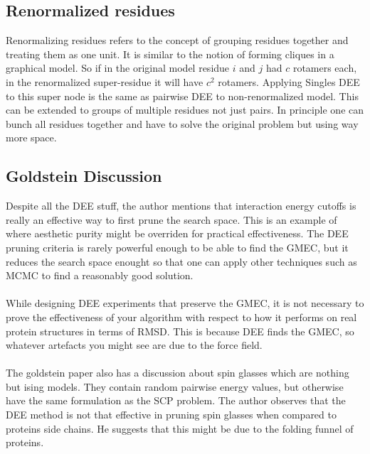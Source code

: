 \documentclass{article}
\begin{document}
\subsection{Renormalized residues}
Renormalizing residues refers to the concept of grouping residues together and treating them as one unit. It is similar to the notion of forming cliques in a graphical model. So if in the original model residue $i$ and $j$ had $c$ rotamers each, in the renormalized super-residue it will have $c^2$  rotamers. Applying Singles DEE to this super node is the same as pairwise DEE to non-renormalized model. This can be extended to groups of multiple residues not just pairs. In principle one can bunch all residues together and have to solve the original problem but using way more space. 


\subsection{Goldstein Discussion}
Despite all the DEE stuff, the author mentions that interaction energy cutoffs is really an effective way to first prune the search space. This is an example of where aesthetic purity might be overriden for practical effectiveness. The DEE pruning criteria is rarely powerful enough to be able to find the GMEC, but it reduces the search space enought so that one can apply other techniques such as MCMC to find a reasonably good solution. 
\\
\\
While designing DEE experiments that preserve the GMEC, it is not necessary to prove the effectiveness of your algorithm with respect to how it performs on real protein structures in terms of RMSD. This is because DEE finds the GMEC, so whatever artefacts you might see are due to the force field. 
\\
\\
The goldstein paper also has a discussion about spin glasses which are nothing but ising models. They contain random pairwise energy values, but otherwise have the same formulation as the SCP problem. The author observes that the DEE method is not that effective in pruning spin glasses when compared to proteins side chains. He suggests that this might be due to the folding funnel of proteins.
\end{document}
